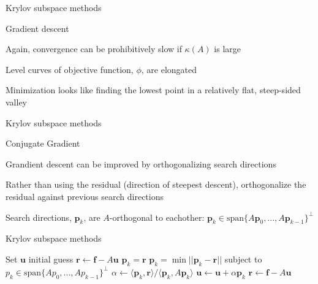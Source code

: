 \documentclass[18pt,xcolor=table]{beamer}
\begin{document}
\begin{frame}{Krylov subspace methods}
\begin{block}{Gradient descent}
\bit
\item Again, convergence can be prohibitively slow if $\kappa(A)$ is large
\item Level curves of objective function, $\phi$, are elongated
\item Minimization looks like finding the lowest point in a relatively flat, steep-sided valley
\eit
\end{block}
\end{frame}

\begin{frame}{Krylov subspace methods}
\begin{block}{Conjugate Gradient}
\bit
\item Grandient descent can be improved by orthogonalizing search directions
\item Rather than using the residual (direction of steepest descent), orthogonalize the residual against previous search directions
\item Search directions, $\mathbf{p}_k$, are $A$-orthogonal to eachother: $\mathbf{p}_k\in\text{span}\{A\mathbf{p}_0,...,A\mathbf{p}_{k-1}\}^\perp$
\eit
\end{block}
\end{frame}

\begin{frame}{Krylov subspace methods}
\begin{algorithm}[H]
\caption{Conjugate Gradient (idea)}
\begin{algorithmic}
\State Set $\mathbf{u}$ initial guess
\State $\mathbf{r} \leftarrow \mathbf{f} - A\mathbf{u}$
\State $\mathbf{p}_k = \mathbf{r}$
\Else
\State $\mathbf{p}_k = \min||\mathbf{p}_k - \mathbf{r}||$ subject to $p_k\in\text{span}\{Ap_0,...,Ap_{k-1}\}^\perp$
\EndIf
\State $\alpha \leftarrow \langle \mathbf{p}_k, \mathbf{r} \rangle / \langle \mathbf{p}_k, A\mathbf{p}_k \rangle$
\State $\mathbf{u} \leftarrow \mathbf{u} + \alpha\mathbf{p}_k$
\State $\mathbf{r} \leftarrow \mathbf{f} - A\mathbf{u}$
\EndFor
\end{algorithmic}
\end{algorithm}
\end{frame}
\end{document}
